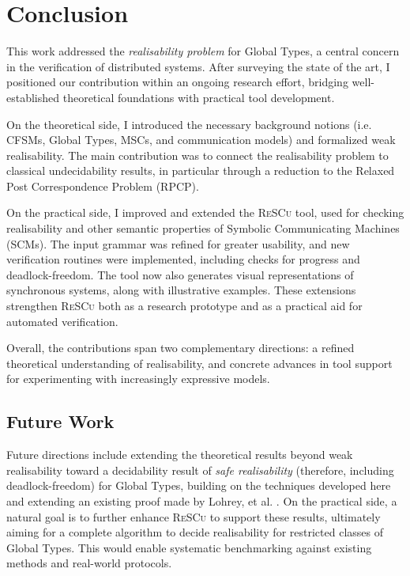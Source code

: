 \chapter{Conclusion}\label{sec:end}
This work addressed the \emph{realisability problem} for Global 
Types, a central concern in the verification of distributed systems. 
After surveying the state of the art, I positioned our contribution 
within an ongoing research effort, bridging well-established 
theoretical foundations with practical tool development.  

On the theoretical side, I introduced the necessary background 
notions (i.e. CFSMs, Global Types, MSCs, and communication models) and 
formalized weak realisability. The main contribution was to connect 
the realisability problem to classical undecidability results, in 
particular through a reduction to the Relaxed Post Correspondence 
Problem (RPCP).  

On the practical side, I improved and extended the 
\textsc{ReSCu} tool, used for checking realisability and other semantic 
properties of Symbolic Communicating Machines (SCMs). The input grammar 
was refined for greater usability, and new verification routines were 
implemented, including checks for progress and deadlock-freedom. The tool 
now also generates visual representations of synchronous systems, along 
with illustrative examples. These extensions strengthen 
\textsc{ReSCu} both as a research prototype and as a practical aid for 
automated verification.  

Overall, the contributions span two complementary directions: a refined 
theoretical understanding of realisability, and concrete advances in 
tool support for experimenting with increasingly expressive models. 

\section{Future Work}
Future directions include extending the theoretical results beyond weak 
realisability toward a decidability result of \emph{safe realisability} 
(therefore, including deadlock-freedom) for 
Global Types, building on the techniques developed here and extending
an existing proof made by Lohrey, et al. \cite{lohrey2003realizability}.
On the practical side, a natural goal is to further enhance \textsc{ReSCu} to  
support these results, ultimately aiming for a complete algorithm to decide 
realisability for restricted classes of Global Types. This would 
enable systematic benchmarking against existing methods and real-world 
protocols.